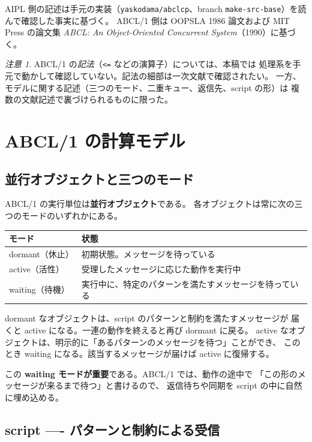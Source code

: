 \documentclass[11pt,a4paper]{ltjsarticle}
\theoremstyle{remark}
\newtheorem{remark}{注意}
\begin{document}
AIPL 側の記述は手元の実装（\texttt{yaskodama/abclcp}、branch
\texttt{make-src-base}）を読んで確認した事実に基づく。
ABCL/1 側は OOPSLA 1986 論文および MIT Press の論文集
\emph{ABCL: An Object-Oriented Concurrent System}（1990）に基づく。

\begin{remark}
ABCL/1 の\emph{記法}（\texttt{<=} などの演算子）については、本稿では
処理系を手元で動かして確認していない。記法の細部は一次文献で確認されたい。
一方、モデルに関する記述（三つのモード、二重キュー、返信先、script の形）は
複数の文献記述で裏づけられるものに限った。
\end{remark}

\section{ABCL/1 の計算モデル}

\subsection{並行オブジェクトと三つのモード}

ABCL/1 の実行単位は\textbf{並行オブジェクト}である。
各オブジェクトは常に次の三つのモードのいずれかにある。

\begin{center}
\begin{tabular}{@{}ll@{}}
\toprule
モード & 状態 \\
\midrule
dormant（休止） & 初期状態。メッセージを待っている \\
active（活性）   & 受理したメッセージに応じた動作を実行中 \\
waiting（待機）  & 実行中に、特定のパターンを満たすメッセージを待っている \\
\bottomrule
\end{tabular}
\end{center}

dormant なオブジェクトは、script のパターンと制約を満たすメッセージが
届くと active になる。一連の動作を終えると再び dormant に戻る。
active なオブジェクトは、明示的に「あるパターンのメッセージを待つ」ことができ、
このとき waiting になる。該当するメッセージが届けば active に復帰する。

この \textbf{waiting モードが重要}である。ABCL/1 では、動作の途中で
「この形のメッセージが来るまで待つ」と書けるので、
返信待ちや同期を script の中に自然に埋め込める。

\subsection{script ---- パターンと制約による受信}
\end{document}
